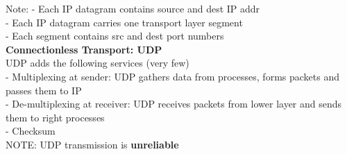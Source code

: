 \documentclass[10pt, a4paper]{article}
\newcommand{\highlight}[1]{{\color{red}\textbf{#1}}}
\newcommand{\blue}[1]{{\color{MidnightBlue}#1}}
\newcommand{\red}[1]{{\color{red}#1}}
\begin{document}
\begin{multicols*}{3}
		Note:
		- Each IP datagram contains \blue{source and dest IP addr}\\
		- Each IP datagram carries \blue{one transport layer segment}\\
		- Each segment contains \blue{src and dest port numbers}\\

		\textbf{Connectionless Transport: UDP}\\
		UDP adds the following services (very few)\\
		- \blue{Multiplexing} at sender: UDP gathers data from processes, forms packets and passes them to IP\\
		- \blue{De-multiplexing} at receiver: UDP receives packets from lower layer and sends them to right processes\\
		- \blue{Checksum}\\
		\red{NOTE}: UDP transmission is \highlight{unreliable}\\






		
		
		
		
	\end{multicols*}
\end{document}

